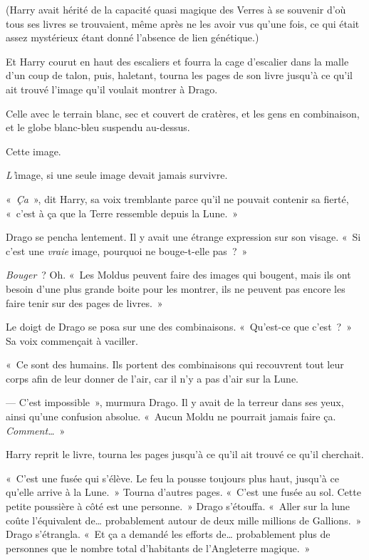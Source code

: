 (Harry avait hérité de la capacité quasi magique des Verres à se souvenir d'où tous ses livres se trouvaient, même après ne les avoir vus qu'une fois, ce qui était assez mystérieux étant donné l'absence de lien génétique.)

Et Harry courut en haut des escaliers et fourra la cage d'escalier dans la malle d'un coup de talon, puis, haletant, tourna les pages de son livre jusqu'à ce qu'il ait trouvé l'image qu'il voulait montrer à Drago.

Celle avec le terrain blanc, sec et couvert de cratères, et les gens en combinaison, et le globe blanc-bleu suspendu au-dessus.

Cette image.

\emph{L'}image, si une seule image devait jamais survivre.

«~\emph{Ça}~», dit Harry, sa voix tremblante parce qu'il ne pouvait contenir sa fierté, «~c'est à ça que la Terre ressemble depuis la Lune.~»

Drago se pencha lentement. Il y avait une étrange expression sur son visage. «~Si c'est une \emph{vraie} image, pourquoi ne bouge-t-elle pas~?~»

\emph{Bouger}~? Oh. «~Les Moldus peuvent faire des images qui bougent, mais ils ont besoin d'une plus grande boite pour les montrer, ils ne peuvent pas encore les faire tenir sur des pages de livres.~»

Le doigt de Drago se posa sur une des combinaisons. «~Qu'est-ce que c'est~?~» Sa voix commençait à vaciller.

«~Ce sont des humains. Ils portent des combinaisons qui recouvrent tout leur corps afin de leur donner de l'air, car il n'y a pas d'air sur la Lune.

--- C'est impossible~», murmura Drago. Il y avait de la terreur dans ses yeux, ainsi qu'une confusion absolue. «~Aucun Moldu ne pourrait jamais faire ça. \emph{Comment…}~»

Harry reprit le livre, tourna les pages jusqu'à ce qu'il ait trouvé ce qu'il cherchait.

«~C'est une fusée qui s'élève. Le feu la pousse toujours plus haut, jusqu'à ce qu'elle arrive à la Lune.~» Tourna d'autres pages. «~C'est une fusée au sol. Cette petite poussière à côté est une personne.~» Drago s'étouffa. «~Aller sur la lune coûte l'équivalent de… probablement autour de deux mille millions de Gallions.~» Drago s'étrangla. «~Et ça a demandé les efforts de… probablement plus de personnes que le nombre total d'habitants de l'Angleterre magique.~»

